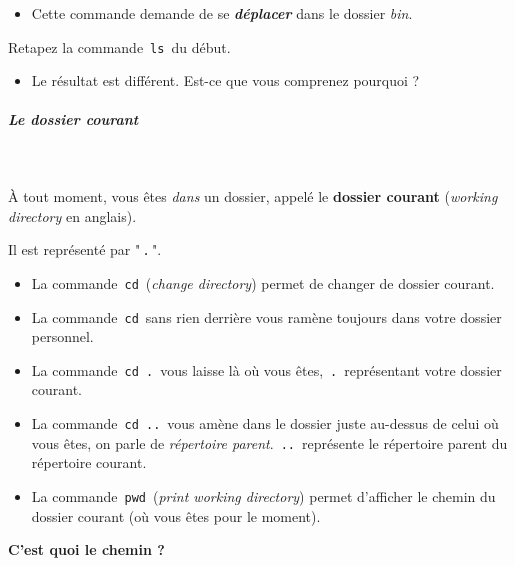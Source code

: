 \documentclass[11pt,a4paper]{article}
\begin{document}
					\begin{itemize}
				
			\item 
						Cette commande demande de se
						\textit{\textbf{d\'eplacer}}
						dans le dossier \textit{bin}.
					
					\end{itemize}
				
					Retapez la commande	\,\verb|ls|\, du d\'ebut.
				
            \par
        
					\begin{itemize}
				
			\item Le r\'esultat est diff\'erent. Est-ce que vous comprenez pourquoi ?
					\end{itemize}
				
			
		\subparagraph{Le dossier courant} 
		
					\textcolor{white}{.} \par
				
            \par
        
					\`A tout moment, vous \^etes \textit{dans} un dossier,
					appel\'e le \textbf{dossier courant}
					(\textit{working directory} en anglais).
				
            \par
        
  				Il est repr\'esent\'e par "\,\verb|.|\,".
				
            \par
        
					\begin{itemize}
				
			\item 
						La commande \,\verb|cd|\,
						(\textit{change directory}) 
						permet de changer de dossier courant.
					
			\item 
						La commande \,\verb|cd|\,
						sans rien derri\`ere vous ram\`ene toujours dans votre dossier personnel.
					
			\item 
						La commande \,\verb|cd .|\,
						vous laisse l\`a o\`u vous \^etes, \,\verb|.|\, 
						repr\'esentant votre dossier courant.
					
			\item 
						La commande \,\verb|cd ..|\,
						vous am\`ene dans le dossier juste au-dessus de celui o\`u vous \^etes,
						on parle de \textit{r\'epertoire parent}.
						\,\verb|..|\, 
						repr\'esente le r\'epertoire parent du r\'epertoire courant.
					
			\item 
						La commande \,\verb|pwd|\,
						(\textit{print working directory})
						permet d'afficher le chemin du dossier courant (o\`u vous \^etes pour le moment).
					
					\end{itemize}
				\textbf{C'est quoi le chemin ?}
            \par
        
\end{document}
